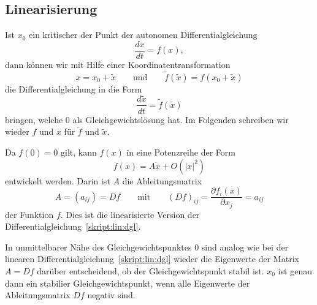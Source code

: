 \subsection{Linearisierung\label{subsection:linearisierung}}
Ist $x_0$ ein kritischer der Punkt der autonomen Differentialgleichung
\[
\frac{dx}{dt} = f(x),
\]
dann können wir mit Hilfe einer Koordinatentransformation
\[
x = x_0 + \tilde x
\qquad
\text{und}
\qquad
\tilde f(\tilde x) = f(x_0 + \tilde x)
\]
die Differentialgleichung in die Form
\[
\frac{d\tilde x}{dt}
=
\tilde f(\tilde x)
\]
bringen, welche $0$ als Gleichgewichtslösung hat.
Im Folgenden schreiben wir wieder $f$ und $x$ für $\tilde f$ und $\tilde x$.

Da $f(0)=0$ gilt, kann $f(x)$ in eine Potenzreihe der Form
\[
f(x) = Ax + O(|x|^2)
\]
entwickelt werden.
Darin ist $A$ die Ableitungsmatrix
\[
A=(a_{ij})=Df
\qquad\text{mit}\qquad
(Df)_{ij}
=
\frac{\partial f_i(x)}{\partial x_j} = a_{ij}
\]
der Funktion $f$.
Dies ist die linearisierte Version der
Differentialgleichung~\eqref{skript:lin:dgl}.

In unmittelbarer Nähe des Gleichgewichtspunktes $0$ sind analog wie
bei der linearen Differentialgleichung~\eqref{skript:lin:dgl}
wieder die Eigenwerte der Matrix $A=Df$ darüber entscheidend, ob der
Gleichgewichtspunkt stabil ist.
$x_0$ ist genau dann ein stabilier Gleichgewichtspunkt, wenn alle
Eigenwerte der Ableitungsmatrix $Df$ negativ sind.








